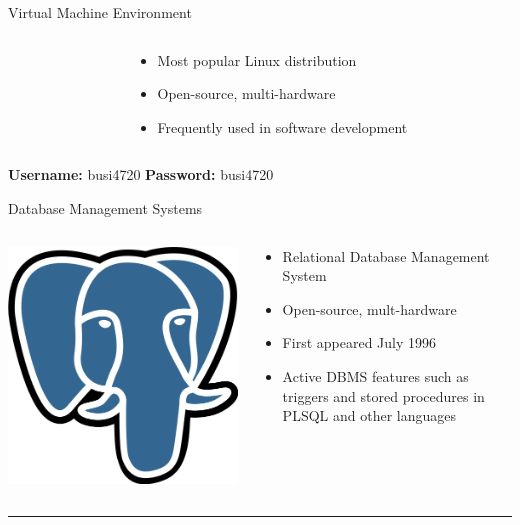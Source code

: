 \documentclass[ignorenonframetext,xcolor=dvipsnames]{beamer}
\begin{document}
\begin{frame}{Virtual Machine Environment}
\begin{columns}
\begin{column}{.25\textwidth}
\end{column}
\begin{column}{.75\textwidth}
\begin{itemize}
  \item Most popular Linux distribution
  \item Open-source, multi-hardware
  \item Frequently used in software development
\end{itemize}
\end{column}
\end{columns}
\vspace{1cm}
{\bf Username:} busi4720 {\bf Password:} busi4720
\end{frame}

\begin{frame}{Database Management Systems}
\begin{columns}
\begin{column}{.25\textwidth}
\centering 
\includegraphics[width=.6\columnwidth]{postgresql-logo.png}
\end{column}
\begin{column}{.75\textwidth}
\begin{itemize}
  \item Relational Database Management System
  \item Open-source, mult-hardware
  \item First appeared July 1996
  \item Active DBMS features such as triggers and stored procedures in PLSQL and other languages
\end{itemize}
\end{column}
\end{columns}
\vspace{4mm} \rule{\textwidth}{1pt} \vspace{2mm}

\end{frame}
\end{document}
